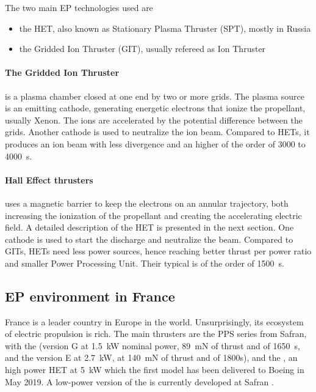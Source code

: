 The two main \ac{EP} technologies used are
\begin{itemize}
  \item the \ac{HET}, also known as Stationary Plasma Thruster (SPT), mostly in Russia
  \item the Gridded Ion Thruster (GIT), usually refereed as Ion Thruster
\end{itemize}
 
 \paragraph{The Gridded Ion Thruster} is a plasma chamber closed at one end by two or more grids.
 The plasma source is an emitting cathode, generating energetic electrons that ionize the propellant, usually Xenon.
 The ions are accelerated by the potential difference between the grids.
 Another cathode is used to neutralize the ion beam.
 Compared to \ac{HET}s, it produces an ion beam with less divergence and an higher \Isp of the order of 3000 to 4000~s.
 
 
 \paragraph{Hall Effect thrusters} uses a magnetic barrier to keep the electrons on an annular trajectory, both increasing the ionization of the propellant and creating the accelerating electric field.
 A detailed description of the \ac{HET} is presented in the next section.
 One cathode is used to start the discharge and neutralize the beam.
 Compared to GITs, HETs need less power sources, hence reaching better thrust per power ratio and smaller Power Processing Unit.
 Their typical \Isp is of the order of 1500~s.
 
 \subsection*{\ac{EP} environment in France} \label{subsec-HET_thruster}
 
 France is a leader country in Europe in the world.
 Unsurprisingly, its ecosystem of electric propulsion is rich.
 The main thrusters are the PPS series from Safran, with the  (version G at 1.5~kW nominal power, 89~mN of thrust and \Isp of 1650~s, and the version E at 2.7~kW, at 140~mN of thrust and \Isp of 1800s), and the , an high power \ac{HET} at 5~kW which the first model has been delivered to Boeing in May 2019.
 A low-power version of the \PPS is currently developed at Safran \citep{vaudolon2018}.

